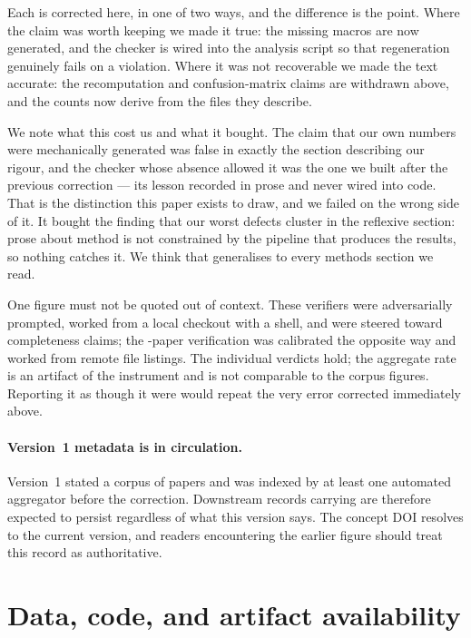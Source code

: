 Each is corrected here, in one of two ways, and the difference is the point. Where the claim
was worth keeping we made it true: the missing macros are now generated, and the checker is
wired into the analysis script so that regeneration genuinely fails on a violation. Where it
was not recoverable we made the text accurate: the recomputation and confusion-matrix claims
are withdrawn above, and the counts now derive from the files they describe.

We note what this cost us and what it bought. The claim that our own numbers were mechanically
generated was false in exactly the section describing our rigour, and the checker whose absence
allowed it was the one we built after the previous correction --- its lesson recorded in prose
and never wired into code. That is the distinction this paper exists to draw, and we failed on
the wrong side of it. It bought the finding that our worst defects cluster in the reflexive
section: prose about method is not constrained by the pipeline that produces the results, so
nothing catches it. We think that generalises to every methods section we read.

One figure must not be quoted out of context. These verifiers were adversarially prompted,
worked from a local checkout with a shell, and were steered toward completeness claims; the
\nPhaseRPapers{}-paper verification was calibrated the opposite way and worked from remote file
listings. The individual verdicts hold; the aggregate rate is an artifact of the instrument and
is not comparable to the corpus figures. Reporting it as though it were would repeat the very
error corrected immediately above.

\paragraph{Version~1 metadata is in circulation.} Version~1 stated a corpus of
\nCorpusVOne{} papers and was indexed by at least one automated aggregator before the
correction. Downstream records carrying \nCorpusVOne{} are therefore expected to persist
regardless of what this version says. The concept DOI resolves to the current version, and
readers encountering the earlier figure should treat this record as authoritative.

\section{Data, code, and artifact availability}
\label{sec:avail}

